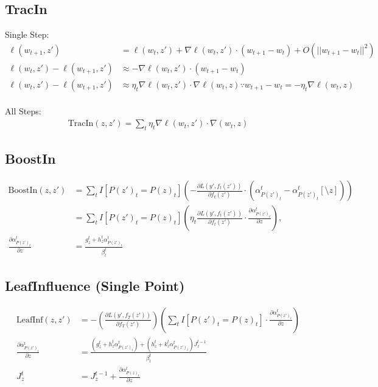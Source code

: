 \documentclass[12pt]{article}
\begin{document}
\subsection*{TracIn}

Single Step:
\begin{align*}
\ell(w_{t+1}, z') &= \ell(w_t, z') + \nabla \ell(w_t, z') \cdot (w_{t+1} - w_t) + O(||w_{t+1} - w_t||^2) \\
\ell(w_t, z')  - \ell(w_{t+1}, z') &\approx -\nabla \ell(w_t, z') \cdot (w_{t+1} - w_t) \\
\ell(w_t, z')  - \ell(w_{t+1}, z') &\approx \eta_t \nabla \ell(w_t, z') \cdot \nabla \ell(w_t, z) \because w_{t+1} - w_t = -\eta_t \nabla \ell(w_t, z)
\end{align*}
\\
All Steps:
\begin{align*}
\text{TracIn}(z, z') = \sum_t \eta_t \nabla \ell(w_t, z') \cdot \nabla (w_t, z)
\end{align*}

\subsection*{BoostIn}
\begin{align*}
\text{BoostIn}(z, z') &= \sum_t I[P(z')_t = P(z)_t] \left(- \frac{\partial L(y', f_t(z'))}{\partial f_t(z')} \cdot (\alpha_{P(z')_t}^{t} - \alpha_{P(z')_t}^t[\setminus z]) \right) \\
&= \boxed{\sum_t I[P(z')_t = P(z)_t] \left(\eta_t \frac{\partial L(y', f_t(z'))}{\partial f_t(z')} \cdot \frac{\partial \alpha_{P(z')_t}^t}{\partial z} \right)}, \\
\frac{\partial \alpha_{P(z')_t}^t}{\partial z} &= \frac{g_z^t + h_z^t\alpha_{P(z')_t}^t}{\beta_l^t}
\end{align*}

\subsection*{LeafInfluence (Single Point)}
\begin{align*}
\text{LeafInf}(z, z') &= \boxed{-\left(\frac{\partial L(y', f_T(z'))}{\partial f_T(z')}\right) \left(\sum_t I[P(z')_t = P(z)_t] \cdot \frac{\partial \alpha_{P(z')_t}^t}{\partial z} \right)} \\
\frac{\partial \alpha_{P(z')_t}^t}{\partial z} &= \frac{(g_z^t + h_z^t\alpha_{P(z')_t}^t) + (h_z^t + k_z^t \alpha_{P(z')_t}^t)J_z^{t-1}}{\beta_l^t} \\
J_z^t &= J_z^{t-1} + \frac{\partial \alpha_{P(z)_t}^t}{\partial z}
\end{align*}
\end{document}

